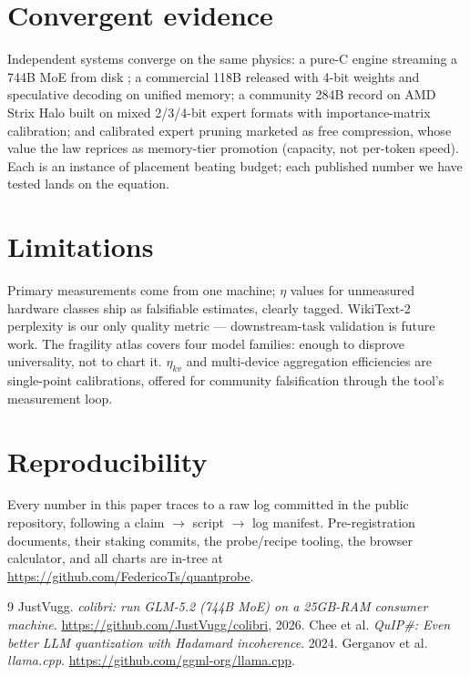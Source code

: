 \documentclass[11pt]{article}
\begin{document}
\section{Convergent evidence}
Independent systems converge on the same physics: a pure-C engine streaming a 744B MoE from disk
\cite{colibri}; a commercial 118B released with 4-bit weights and speculative decoding on unified
memory; a community 284B record on AMD Strix Halo built on mixed 2/3/4-bit expert formats with
importance-matrix calibration; and calibrated expert pruning marketed as free compression, whose
value the law reprices as memory-tier promotion (capacity, not per-token speed). Each is an
instance of placement beating budget; each published number we have tested lands on the equation.

\section{Limitations}
Primary measurements come from one machine; $\eta$ values for unmeasured hardware classes ship as
falsifiable estimates, clearly tagged. WikiText-2 perplexity is our only quality metric ---
downstream-task validation is future work. The fragility atlas covers four model families: enough
to disprove universality, not to chart it. $\eta_{kv}$ and multi-device aggregation efficiencies are
single-point calibrations, offered for community falsification through the tool's measurement loop.

\section{Reproducibility}
Every number in this paper traces to a raw log committed in the public repository, following a
claim $\to$ script $\to$ log manifest. Pre-registration documents, their staking commits, the
probe/recipe tooling, the browser calculator, and all charts are in-tree at
\url{https://github.com/FedericoTs/quantprobe}.

\begin{thebibliography}{9}
 JustVugg. \emph{colibri: run GLM-5.2 (744B MoE) on a 25GB-RAM consumer machine}.
\url{https://github.com/JustVugg/colibri}, 2026.
 Chee et al. \emph{QuIP\#: Even better LLM quantization with Hadamard incoherence}.
2024.  Gerganov et al. \emph{llama.cpp}. \url{https://github.com/ggml-org/llama.cpp}.
\end{thebibliography}
\end{document}

